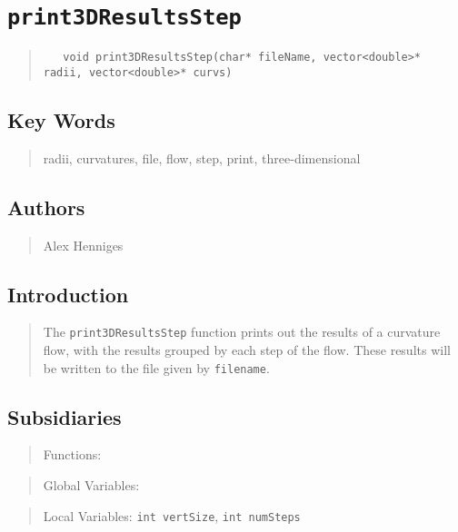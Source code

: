 \documentclass[10pt]{article}%
\begin{document}

\section*{\texttt{print3DResultsStep}}

\label{f0}\begin{quotation} {\small{\begin{verbatim} 
   void print3DResultsStep(char* fileName, vector<double>* radii, vector<double>* curvs)
   \end{verbatim}
}}
\end{quotation}
\subsection*{Key Words}

\begin{quotation} radii, curvatures, file, flow, step, print, three-dimensional\end{quotation}

\subsection*{Authors}

\begin{quotation} Alex Henniges\end{quotation}

\subsection*{Introduction}

\begin{quotation} The \texttt{print3DResultsStep} function prints out the results of a curvature flow, with the results grouped by each step of the flow. These results will be written to the file given by \texttt{filename}.\end{quotation}

\subsection*{Subsidiaries}

\begin{quotation} Functions:\end{quotation}
\begin{quotation} Global Variables:\end{quotation}
\begin{quotation} Local Variables: \texttt{int vertSize}, \texttt{int numSteps}\end{quotation}
\end{document}
